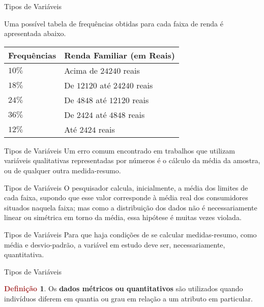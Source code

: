 \documentclass[10pt]{beamer}
\renewcommand{\indent}{\hspace*{2em}}
\theoremstyle{definition}
\newtheorem{defn}{\textcolor{brown}{Definição}}[section]
\begin{document}
\begin{frame}{Tipos de Variáveis}
\begin{block}{}
\vfill\indent Uma possível tabela de frequências obtidas para cada faixa de renda é apresentada abaixo.
\begin{table}[]
\begin{tabular}{|l|l|}
\hline
 Frequências & Renda Familiar (em Reais) \\ \hline
 $10\%$ & Acima de $24240$ reais \\ \hline
 $18\%$ & De $12120$ até $24240$ reais \\ \hline
 $24\%$ & De $4848$ até $12120$ reais \\ \hline
 $36\%$ & De $2424$ até $4848$ reais \\ \hline
 $12\%$ & Até $2424$ reais \\ \hline
\end{tabular}
\end{table}
\end{block}
\end{frame}

\begin{frame}{Tipos de Variáveis}
\indent Um erro comum encontrado em trabalhos que utilizam variáveis qualitativas representadas por números é o cálculo da média da amostra, ou de qualquer outra medida-resumo.
\end{frame}

\begin{frame}{Tipos de Variáveis}
\indent O pesquisador calcula, inicialmente, a média dos limites de cada faixa, supondo que esse valor corresponde à média real dos consumidores situados naquela faixa; mas como a distribuição dos dados não é necessariamente linear ou simétrica em torno da média, essa hipótese é muitas vezes violada.
\end{frame}

\begin{frame}{Tipos de Variáveis}
\indent Para que haja condições de se calcular medidas-resumo, como média e desvio-padrão, a variável em estudo deve ser, necessariamente, quantitativa.
\end{frame}

\begin{frame}{Tipos de Variáveis}
\begin{defn}
\vfill\indent  Os \textbf{dados métricos ou quantitativos} são utilizados quando indivíduos diferem em quantia ou grau em relação a um atributo em particular.
\end{defn}
\end{frame}
\end{document}
